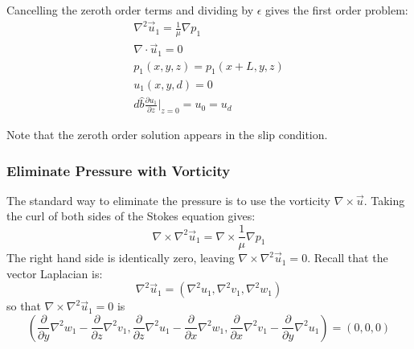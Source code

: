 \documentclass[12pt, a4paper, twoside, openright]{book}
\begin{document}
Cancelling the zeroth order terms and dividing by $\epsilon$ gives the first order problem:
\begin{gather}
\nabla^2 \vec{u}_1 = \frac{1}{\mu} \nabla p_1 \\
\nabla \cdot \vec{u}_1 = 0  \\
p_1(x,y,z) = p_1(x+L,y,z) \\
u_1(x,y,d) = 0 \\ 
d \hat{b} \frac{\partial u_1}{\partial z} \rvert_{z=0} = u_0 =  u_d
\end{gather}

Note that the zeroth order solution appears in the slip condition.

\subsubsection*{Eliminate Pressure with Vorticity}

The standard way to eliminate the pressure is to use the vorticity $\nabla \times \vec{u}$.
Taking the curl of both sides of the Stokes equation gives:
\begin{equation}
\nabla \times \nabla^2 \vec{u}_1  = \nabla \times \frac{1}{\mu} \nabla p_1 
\end{equation}
The right hand side is identically zero, leaving $ \nabla \times \nabla^2 \vec{u}_1 = 0 $.
Recall that the vector Laplacian is:
\begin{equation}
\nabla^2 \vec{u}_1 = \left( \nabla^2 u_1, \nabla^2 v_1, \nabla^2 w_1 \right)
\end{equation}
so that $  \nabla \times \nabla^2 \vec{u}_1 = 0 $ is
\begin{equation}
\left( 
\frac{\partial}{\partial y} \nabla^2 w_1 - \frac{\partial}{\partial z} \nabla^2 v_1,
\frac{\partial}{\partial z} \nabla^2 u_1 - \frac{\partial}{\partial x} \nabla^2 w_1,
\frac{\partial}{\partial x} \nabla^2 v_1 - \frac{\partial}{\partial y} \nabla^2 u_1
\right) = (0,0,0)
\end{equation}
\end{document}
